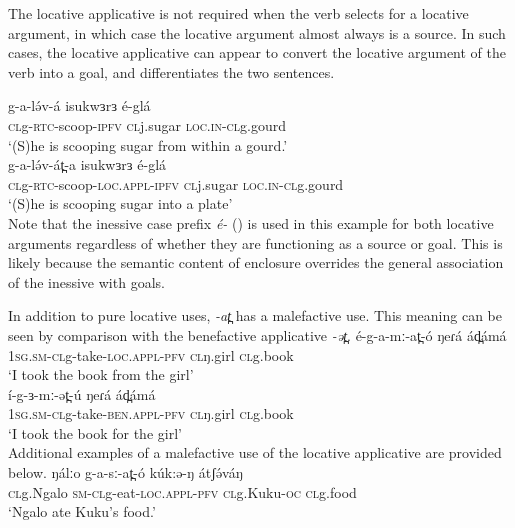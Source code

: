  
The locative applicative is not required when the verb selects for a locative argument, in which case the locative argument almost always is a source. In such cases, the locative applicative can appear to convert the locative argument of the verb into a goal, and differentiates the two sentences.

\ea
\ea \gll g-a-lə́v-á 			isukwɜrɜ 		é-glá	\\
	\textsc{cl}g-\textsc{rtc}-scoop-\textsc{ipfv}	\textsc{cl}j.sugar		\textsc{loc.in-cl}g.gourd\\
	\glt ‘(S)he is scooping sugar from within a gourd.’\\

\ex \gll g-a-lə́v-át̪-a 				isukwɜrɜ 	é-glá	\\
		\textsc{cl}g-\textsc{rtc}-scoop-\textsc{loc.appl}-\textsc{ipfv}	\textsc{cl}j.sugar	\textsc{loc.in-cl}g.gourd\\
	\glt `(S)he is scooping sugar into a plate'\\
\z
\z
Note that the inessive case prefix \textit{é-} () is used in this example for both locative arguments regardless of whether they are functioning as a source or goal. This is likely because the semantic content of enclosure overrides the general association of the inessive with goals.


%
%


In addition to pure locative uses, \textit{-at̪} has a malefactive use. This meaning can be seen by comparison with the benefactive applicative \textit{-ət̪}.
\ea
\ea \gll é-g-a-mː-at̪-ó 				ŋeɾá 		ád̪ámá  \\
	1\textsc{sg.sm-cl}g-take-\textsc{loc.appl-\textsc{pfv}}		\textsc{cl}ŋ.girl		\textsc{cl}g.book	\\
	\glt ‘I took the book from the girl’\\

\ex	\gll í-g-ɜ-mː-ət̪-ú 				ŋeɾá 		ád̪ámá    \\
	1\textsc{sg.sm-cl}g-take-\textsc{ben.appl-\textsc{pfv}}		\textsc{cl}ŋ.girl		\textsc{cl}g.book	\\
	\glt ‘I took the book for the girl’\\
\z
\z
Additional examples of a malefactive use of the locative applicative are provided below.
\ea
\ea	\gll ŋálːo		g-a-sː-at̪-ó 			kúk:ə-ŋ 		átʃə́váŋ\\
	\textsc{cl}g.Ngalo	\textsc{sm-cl}g-eat-\textsc{loc.appl-\textsc{pfv}}	\textsc{cl}g.Kuku-\textsc{oc}	\textsc{cl}g.food\\
	\glt	`Ngalo ate Kuku's food.'\\

